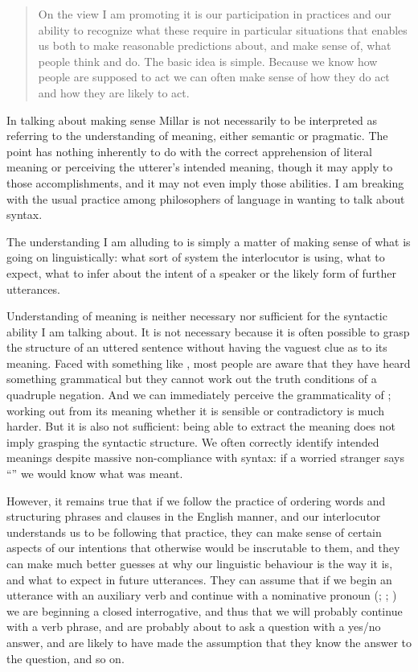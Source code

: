 \documentclass[output=paper]{langscibook}
\begin{document}
\begin{quote} On the view I am promoting it is our participation in practices and our ability to recognize what these require in particular situations that enables us both to make reasonable predictions about, and make sense of, what people think and do. The basic idea is simple. Because we know how people are supposed to act we can often make sense of how they do act and how they are likely to act. \end{quote} In talking about making sense Millar is not necessarily to be interpreted as referring to the understanding of meaning, either semantic or pragmatic. The point has nothing inherently to do with the correct apprehension of literal meaning or perceiving the utterer's intended meaning, though it may apply to those accomplishments, and it may not even imply those abilities.  I am breaking with the usual practice among philosophers of language in wanting to talk about syntax.

The understanding I am alluding to is simply a matter of making sense of what is going on linguistically: what sort of system the interlocutor is using, what to expect, what to infer about the intent of a speaker or the likely form of further utterances.

Understanding of meaning is neither necessary nor sufficient for the syntactic ability I am talking about.  It is not necessary because it is often possible to grasp the structure of an uttered sentence without having the vaguest clue as to its meaning.  Faced with something like , most people are aware that they have heard something grammatical but they cannot work out the truth conditions of a quadruple negation.  And we can immediately perceive the grammaticality of ; working out from its meaning whether it is sensible or contradictory is much harder.  But it is also not sufficient: being able to extract the meaning does not imply grasping the syntactic structure.  We often correctly identify intended meanings despite massive non-compliance with syntax: if a worried stranger says ``'' we would know what was meant.

However, it remains true that if we follow the practice of ordering words and structuring phrases and clauses in the English manner, and our interlocutor understands us to be following that practice, they can make sense of certain aspects of our intentions that otherwise would be inscrutable to them, and they can make much better guesses at why our linguistic behaviour is the way it is, and what to expect in future utterances.  They can assume that if we begin an utterance with an auxiliary verb and continue with a nominative pronoun (; ; ) we are beginning a closed interrogative, and thus that we will probably continue with a verb phrase, and are probably about to ask a question with a yes/no answer, and are likely to have made the assumption that they know the answer to the question, and so on.
\end{document}
